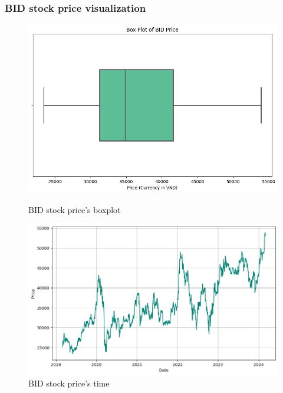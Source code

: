 \documentclass{ieeeojies}
\begin{document}
\subsubsection{BID stock price visualization}
\begin{figure}[H]
    \centering
    \begin{minipage}{0.23\textwidth}
        \centering
        \includegraphics[width=1\textwidth]{bibliography/Figure/BIDboxplot.png}
        \caption{BID stock price's boxplot}
        \label{fig:1}
    \end{minipage}
    \hfill
    \begin{minipage}{0.23\textwidth}
        \centering
        \includegraphics[width=\textwidth]{bibliography/Figure/BIDtime.png}
        \caption{BID stock price's time}
        \label{fig:2}
    \end{minipage}

    \end{figure}
\end{document}
